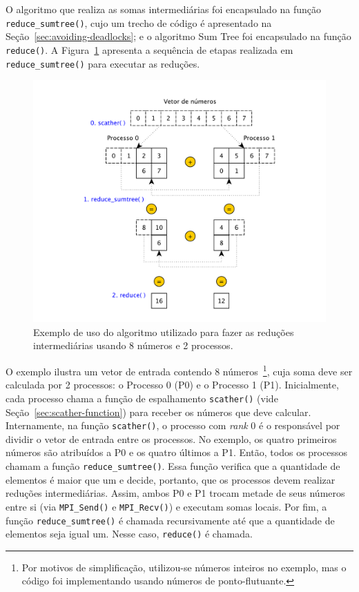 \documentclass[12pt,a4paper]{article}
\begin{document}
O algoritmo que realiza as somas intermediárias foi encapsulado na função
\texttt{reduce\_sumtree()}, cujo um trecho de código é apresentado na
Seção~\ref{sec:avoiding-deadlocks}; e o algoritmo Sum Tree foi encapsulado na
função \texttt{reduce()}. A Figura~\ref{fig:algorithm} apresenta a sequência de
etapas realizada em \texttt{reduce\_sumtree()} para executar as reduções.

\begin{figure}[h!]
\centering
\includegraphics[width=1.0\textwidth]{img/algorithm_yed.pdf}
\caption{Exemplo de uso do algoritmo utilizado para fazer as reduções
intermediárias usando 8 números e 2 processos.}
\label{fig:algorithm}
\end{figure}

O exemplo ilustra um vetor de entrada contendo 8 números~\footnote{Por motivos
de simplificação, utilizou-se números inteiros no exemplo, mas o código foi
implementando usando números de ponto-flutuante.}, cuja soma deve ser
calculada por 2 processos: o Processo 0 (P0) e o Processo 1 (P1). Inicialmente,
cada processo chama a função de espalhamento \texttt{scather()} (vide
Seção~\ref{sec:scather-function}) para receber os números que deve calcular.
Internamente, na função \texttt{scather()}, o processo com \textit{rank} 0 é o
responsável por dividir o vetor de entrada entre os processos. No exemplo, os
quatro primeiros números são atribuídos a P0 e os quatro últimos a P1. Então,
todos os processos chamam a função \texttt{reduce\_sumtree()}. Essa função
verifica que a quantidade de elementos é maior que um e decide, portanto, que os
processos devem realizar reduções intermediárias.  Assim, ambos P0 e P1 trocam
metade de seus números entre si (via \texttt{MPI\_Send()} e
\texttt{MPI\_Recv()}) e executam somas locais. Por fim, a função
\texttt{reduce\_sumtree()} é chamada recursivamente até que a quantidade de
elementos seja igual um. Nesse caso, \texttt{reduce()} é chamada.
\end{document}
